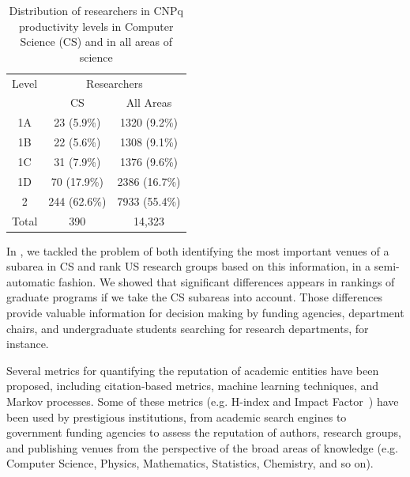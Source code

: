 \begin{table}[htbp]
\centering \small
\caption{Distribution of researchers in CNPq productivity levels in Computer Science (CS) and in all areas of science}
\label{tab:cnpq-levels}
\begin{tabular}{ccc}
\\
\toprule
Level & \multicolumn{2}{c}{Researchers} \\ %
      & CS & All Areas \\ 
\midrule
1A &  23 (5.9\%) & 1320 (9.2\%) \\
1B &  22 (5.6\%) & 1308 (9.1\%) \\
1C &  31 (7.9\%) & 1376 (9.6\%) \\
1D &  70 (17.9\%) & 2386 (16.7\%) \\
2  & 244 (62.6\%) & 7933 (55.4\%) \\
\midrule
Total & 390 & 14,323 \\ %
\bottomrule
\end{tabular}
\end{table}


In \cite{ueda17ictir}, we tackled the problem of both identifying the most important venues of a subarea in CS and rank US research groups based on this information, in a semi-automatic fashion. We showed that significant differences appears in rankings of graduate programs if we take the CS subareas into account. Those differences provide valuable information for decision making by funding agencies, department chairs, and undergraduate students searching for research departments, for instance.

Several metrics for quantifying the reputation of academic entities have been proposed, including citation-based metrics, machine learning techniques, and Markov processes. Some of these metrics (e.g. H-index \cite{hirsch2005} and Impact Factor~\cite{garfield1955}) have been used by prestigious institutions, from academic search engines to government funding agencies to assess the reputation of authors, research groups, and publishing venues from the perspective of the broad areas of knowledge (e.g. Computer Science, Physics, Mathematics, Statistics, Chemistry, and so on). 



